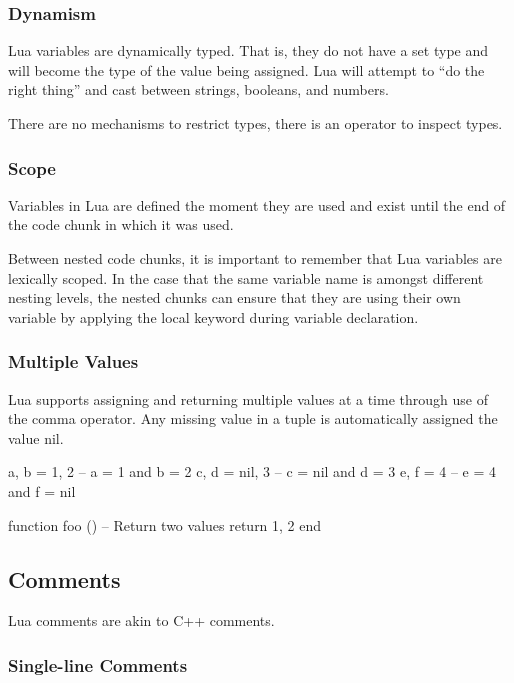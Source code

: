 \documentclass[11pt]{article}
\newcommand{\keyword}[1]{\mbox{\ttfamily#1}}
\begin{document}
\subsubsection{Dynamism}

Lua variables are dynamically typed.  That is, they do not have a set type and
will become the type of the value being assigned.  Lua will attempt to ``do the
right thing'' and cast between strings, booleans, and numbers.

There are no mechanisms to restrict types, there is an operator to inspect
types.

\subsubsection{Scope}

Variables in Lua are defined the moment they are used and exist until the end
of the code chunk in which it was used.

Between nested code chunks, it is important to remember that Lua variables are
lexically scoped.  In the case that the same variable name is amongst different
nesting levels, the nested chunks can ensure that they are using their own
variable by applying the \keyword{local} keyword during variable declaration.

\subsubsection{Multiple Values}

Lua supports assigning and returning multiple values at a time through use of
the comma operator.  Any missing value in a tuple is automatically assigned the
value \keyword{nil}.

\begin{LuaCode}
a, b = 1, 2   -- a = 1 and b = 2
c, d = nil, 3 -- c = nil and d = 3
e, f = 4      -- e = 4 and f = nil
\end{LuaCode}

\begin{LuaCode}
function foo ()
	-- Return two values
	return 1, 2
end
\end{LuaCode}

\subsection{Comments}

Lua comments are akin to C++ comments.

\subsubsection{Single-line Comments}
\end{document}
